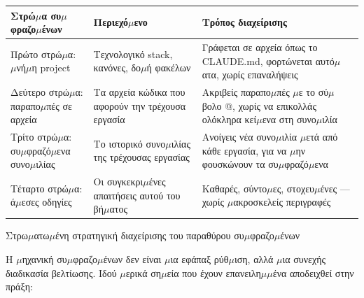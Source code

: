 \begin{center}
\begin{tabularx}{\linewidth}{|X|X|X|}
\hline
\textbf{Στρώ$\mu$α συ$\mu$φραζο$\mu$ένων} & \textbf{Περιεχό$\mu$ενο} & \textbf{Τρόπος διαχείρισης} \tabularnewline
\hline
Πρώτο στρώ$\mu$α: $\mu$νή$\mu$η project & Τεχνολογικό stack, κανόνες, δο$\mu$ή φακέλων & Γράφεται σε αρχεία όπως το CLAUDE.md, φορτώνεται αυτό$\mu$ατα, χωρίς επαναλήψεις \tabularnewline
Δεύτερο στρώ$\mu$α: παραπο$\mu$πές σε αρχεία & Τα αρχεία κώδικα που αφορούν την τρέχουσα εργασία & Ακριβείς παραπο$\mu$πές $\mu$ε το σύ$\mu$βολο @, χωρίς να επικολλάς ολόκληρα κεί$\mu$ενα στη συνο$\mu$ιλία \tabularnewline
Τρίτο στρώ$\mu$α: συ$\mu$φραζό$\mu$ενα συνο$\mu$ιλίας & Το ιστορικό συνο$\mu$ιλίας της τρέχουσας εργασίας & Ανοίγεις νέα συνο$\mu$ιλία $\mu$ετά από κάθε εργασία, για να $\mu$ην φουσκώνουν τα συ$\mu$φραζό$\mu$ενα \tabularnewline
Τέταρτο στρώ$\mu$α: ά$\mu$εσες οδηγίες & Οι συγκεκρι$\mu$ένες απαιτήσεις αυτού του βή$\mu$ατος & Καθαρές, σύντο$\mu$ες, στοχευ$\mu$ένες — χωρίς $\mu$ακροσκελείς περιγραφές \tabularnewline
\hline
\end{tabularx}
\end{center}

\begin{center}\small\color{gray}Στρω$\mu$ατω$\mu$ένη στρατηγική διαχείρισης του παραθύρου συ$\mu$φραζο$\mu$ένων\end{center}


Η $\mu$ηχανική συ$\mu$φραζο$\mu$ένων δεν είναι $\mu$ια εφάπαξ ρύθ$\mu$ιση, αλλά $\mu$ια συνεχής διαδικασία βελτίωσης. Ιδού $\mu$ερικά ση$\mu$εία που έχουν επανειλη$\mu$$\mu$ένα αποδειχθεί στην πράξη:

